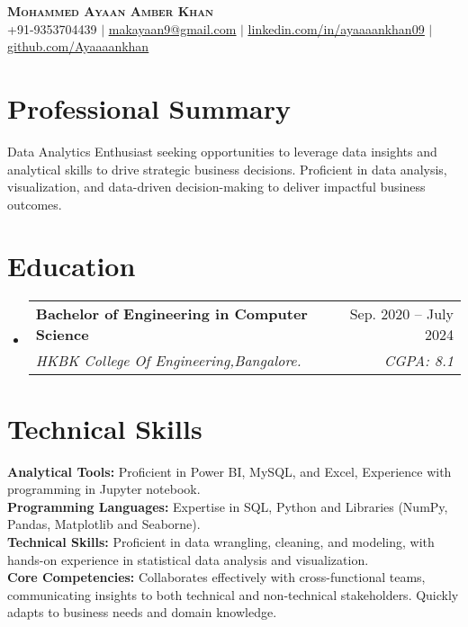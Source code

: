 \documentclass[letterpaper,11pt]{article}
\makeatletter
\newcommand{\resumeSubheading}[4]{
  \vspace{-2pt}\item
    \begin{tabular*}{0.97\textwidth}[t]{l@{\extracolsep{\fill}}r}
      \textbf{#1} & #2 \\
      \textit{\small#3} & \textit{\small #4} \\
    \end{tabular*}\vspace{-7pt}
}
\newcommand{\resumeSubHeadingListStart}{\begin{itemize}[leftmargin=0.15in, label={}]}
\newcommand{\resumeSubHeadingListEnd}{\end{itemize}}
\makeatother
\begin{document}
\begin{center}
    \textbf{\Huge \scshape Mohammed Ayaan Amber Khan} \\ \vspace{1pt}
    \small +91-9353704439 $|$ \href{mailto:mdkaifansa53@gmail.com}{\underline{makayaan9@gmail.com}} $|$ 
    \href{https://linkedin.com/in/...}{\underline{linkedin.com/in/ayaaaankhan09}} $|$
    \href{https://github.com/...}{\underline{github.com/Ayaaaankhan}}
\end{center}

\section{Professional Summary}
\small{Data Analytics Enthusiast seeking opportunities to leverage data insights and analytical skills to drive strategic business decisions. Proficient in data analysis, visualization, and data-driven decision-making to deliver impactful business outcomes.}

\section{Education}
\resumeSubHeadingListStart
  \resumeSubheading
    {Bachelor of Engineering in Computer Science}{Sep. 2020 -- July 2024}
    {HKBK College Of Engineering,Bangalore.}{CGPA: 8.1}
\resumeSubHeadingListEnd

\section{Technical Skills}
\begin{itemize}[leftmargin=0.15in, label={}]
  \small{\item{
   \textbf{Analytical Tools:}  Proficient in Power BI, MySQL, and Excel, Experience with programming in Jupyter notebook. \\
   \textbf{Programming Languages:} Expertise in SQL, Python and Libraries (NumPy, Pandas,  Matplotlib and Seaborne). \\
   \textbf{Technical Skills:}  Proficient in data wrangling, cleaning, and modeling, with hands-on experience in statistical data analysis and visualization. \\
   \textbf{Core Competencies:} Collaborates effectively with cross-functional teams, communicating insights to both technical and non-technical stakeholders. Quickly adapts to business needs and domain knowledge.}}
\end{itemize}
\end{document}
